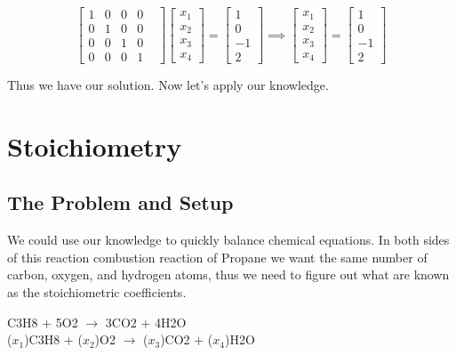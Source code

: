 \documentclass{article}
\begin{document}
\[
\begin{bmatrix}
    1 & 0 & 0 & 0 & \\
    0 & 1 & 0 & 0 & \\
    0 & 0 & 1 & 0 & \\
    0 & 0 & 0 & 1 & 
\end{bmatrix}
\begin{bmatrix}
    x_1 \\
    x_2 \\
    x_3 \\
    x_4
\end{bmatrix}
=
\begin{bmatrix}
    1 \\
    0 \\
    -1 \\
    2
\end{bmatrix}
\implies
\begin{bmatrix}
    x_1 \\
    x_2 \\
    x_3 \\
    x_4
\end{bmatrix}
=
\begin{bmatrix}
    1 \\
    0 \\
    -1 \\
    2
\end{bmatrix}
\]

Thus we have our solution. Now let's apply our knowledge.

\newpage

\section*{Stoichiometry}

\subsection*{The Problem and Setup}

We could use our knowledge to quickly balance chemical equations. In both sides of this reaction combustion reaction of Propane we want the same number of carbon, oxygen, and hydrogen atoms, thus we need to figure out what are known as the stoichiometric coefficients.

\begin{center}
    C3H8 + 5O2 $\xrightarrow{}$ 3CO2 + 4H2O  \\
    ($x_1$)C3H8 + ($x_2$)O2 $\xrightarrow{}$ ($x_3$)CO2 + ($x_4$)H2O
\end{center}
\end{document}
